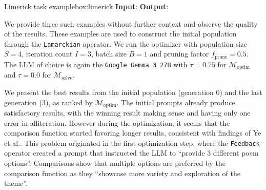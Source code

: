 \begin{figurebox}{Limerick task example}{box:limerick}
    \textbf{Input}:
    \textbf{Output}:
\end{figurebox}

We provide three such examples without further context and observe the quality of the results. These examples are used to construct the initial population through
the \texttt{Lamarckian} operator.
We run the optimizer with population size $S=4$, iteration count $I=3$, batch size $B=1$ and pruning factor $f_{\text{prune}} = 0.5$.
The LLM of choice is again the \texttt{Google Gemma 3 27B} with $\tau = 0.75$ for $\mathscr{M}_{\text{optim}}$ and $\tau = 0.0$ for $\mathscr{M}_{\text{solve}}$.

We present the best results from the initial population (generation $0$) and the last generation ($3$), as ranked by $\mathscr{M}_{\text{optim}}$.
The initial prompts already produce satisfactory results, with the winning result making sense and having only one error in alliteration.
However during the optimization, it seems that the comparison function started favoring longer results, consistent with findings of Ye et al.\cite{ye2024justiceprejudicequantifyingbiases}.
This problem originated in the first optimization step, where the \texttt{Feedback} operator created a prompt that instructed the LLM to ``provide 3 different poem options''.
Comparisons show that multiple options are preferred by the comparison function as they ``showcase more variety and exploration of the theme''.

